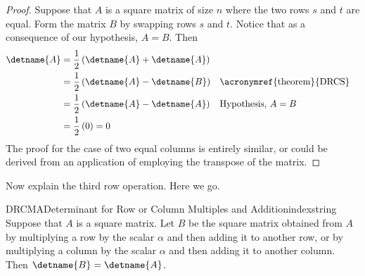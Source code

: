 \begin{proof}
Suppose that $A$ is a square matrix of size $n$ where the two rows $s$ and $t$ are equal.  Form the matrix $B$ by swapping rows $s$ and $t$.  Notice that as a consequence of our hypothesis, $A=B$.  Then
%
\begin{align*}
\detname{A}
&=
\frac{1}{2}\left(\detname{A}+\detname{A}\right)\\
%
&=
\frac{1}{2}\left(\detname{A}-\detname{B}\right)
&&\text{\acronymref{theorem}{DRCS}}\\
%
&=
\frac{1}{2}\left(\detname{A}-\detname{A}\right)
&&\text{Hypothesis, $A=B$}\\
%
&=
\frac{1}{2}\,(0)=0
%
\end{align*}
%
The proof for the case of two equal columns is entirely similar, or could be derived from an application of  employing the transpose of the matrix.
%
\end{proof}
%
Now explain the third row operation.  Here we go.
%
\begin{theorem}{DRCMA}{Determinant for Row or Column Multiples and Addition}{indexstring}
Suppose that $A$ is a square matrix.  Let $B$ be the square matrix obtained from $A$ by multiplying a row by the scalar $\alpha$ and then adding it to another row, or by multiplying a column by the scalar $\alpha$ and then adding it to another column.  Then $\detname{B}=\detname{A}$.
\end{theorem}
%
